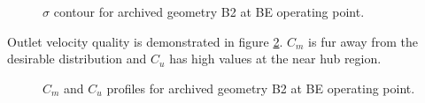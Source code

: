 \begin{figure}[h!]
\begin{minipage}[b]{1\linewidth}
 \centering
\end{minipage}
\caption{$\sigma$ contour for archived geometry B2 at BE operating point.}
\label{Francis-B2-BE}
\end{figure}

Outlet velocity quality is demonstrated in figure \ref{Francis-B2-OUT}. $C_m$ is fur away from the desirable distribution and $C_u$ has high values at the near hub region.   

\begin{figure}[h!]
\begin{minipage}[b]{1\linewidth}
 \centering
\end{minipage}
\caption{$C_m$ and $C_u$ profiles for archived geometry B2 at BE operating point.}
\label{Francis-B2-OUT}
\end{figure}

